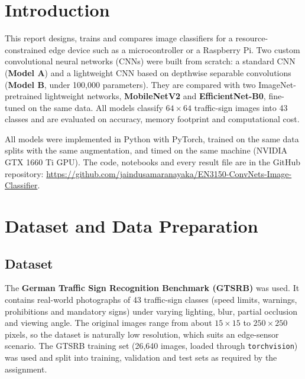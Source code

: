 \documentclass[11pt, a4paper]{article}
\newcommand{\RepoURL}{https://github.com/jaindusamaranayaka/EN3150-ConvNets-Image-Classifier}
\begin{document}
\newpage
\setcounter{page}{1}

\tableofcontents

\newpage

\section{Introduction}

This report designs, trains and compares image classifiers for a resource-constrained edge device such as a
microcontroller or a Raspberry Pi. Two custom convolutional neural networks (CNNs) were built from scratch: a standard
CNN (\textbf{Model A}) and a lightweight CNN based on depthwise separable convolutions (\textbf{Model B}, under
100,000 parameters). They are compared with two ImageNet-pretrained lightweight networks, \textbf{MobileNetV2} and
\textbf{EfficientNet-B0}, fine-tuned on the same data. All models classify $64 \times 64$ traffic-sign images into 43
classes and are evaluated on accuracy, memory footprint and computational cost.

All models were implemented in Python with PyTorch, trained on the same data splits with the same augmentation, and
timed on the same machine (NVIDIA GTX 1660 Ti GPU). The code, notebooks and every result file are in the GitHub
repository: \url{\RepoURL}.

\section{Dataset and Data Preparation}

\subsection{Dataset}

The \textbf{German Traffic Sign Recognition Benchmark (GTSRB)} \cite{gtsrb} was used. It contains real-world
photographs of 43 traffic-sign classes (speed limits, warnings, prohibitions and mandatory signs) under varying
lighting, blur, partial occlusion and viewing angle. The original images range from about $15 \times 15$ to
$250 \times 250$ pixels, so the dataset is naturally low resolution, which suits an edge-sensor scenario. The GTSRB
training set (26,640 images, loaded through \texttt{torchvision}) was used and split into training, validation and
test sets as required by the assignment.
\end{document}
